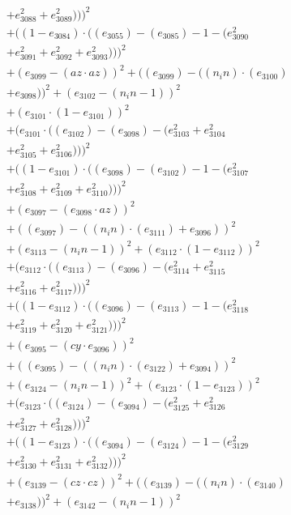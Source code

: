 \documentclass[10pt, a4paper]{article}
\begin{document}
\begin{small}
\begin{align*}
& + e_{3088}^{2} + e_{3089}^{2})))^{2} \\
& + ((1 - e_{3084})  \cdot  ((e_{3055}) - (e_{3085}) - 1 - (e_{3090}^{2} \\
& + e_{3091}^{2} + e_{3092}^{2} + e_{3093}^{2})))^{2} \\
& + (e_{3099} - (az  \cdot  az))^{2} + ((e_{3099}) - ((n_in)  \cdot  (e_{3100}) \\
& + e_{3098}))^{2} + (e_{3102} - (n_in - 1))^{2} \\
& + (e_{3101}  \cdot  (1 - e_{3101}))^{2} \\
& + (e_{3101}  \cdot  ((e_{3102}) - (e_{3098}) - (e_{3103}^{2} + e_{3104}^{2} \\
& + e_{3105}^{2} + e_{3106}^{2})))^{2} \\
& + ((1 - e_{3101})  \cdot  ((e_{3098}) - (e_{3102}) - 1 - (e_{3107}^{2} \\
& + e_{3108}^{2} + e_{3109}^{2} + e_{3110}^{2})))^{2} \\
& + (e_{3097} - (e_{3098}  \cdot  az))^{2} \\
& + ((e_{3097}) - ((n_in)  \cdot  (e_{3111}) + e_{3096}))^{2} \\
& + (e_{3113} - (n_in - 1))^{2} + (e_{3112}  \cdot  (1 - e_{3112}))^{2} \\
& + (e_{3112}  \cdot  ((e_{3113}) - (e_{3096}) - (e_{3114}^{2} + e_{3115}^{2} \\
& + e_{3116}^{2} + e_{3117}^{2})))^{2} \\
& + ((1 - e_{3112})  \cdot  ((e_{3096}) - (e_{3113}) - 1 - (e_{3118}^{2} \\
& + e_{3119}^{2} + e_{3120}^{2} + e_{3121}^{2})))^{2} \\
& + (e_{3095} - (cy  \cdot  e_{3096}))^{2} \\
& + ((e_{3095}) - ((n_in)  \cdot  (e_{3122}) + e_{3094}))^{2} \\
& + (e_{3124} - (n_in - 1))^{2} + (e_{3123}  \cdot  (1 - e_{3123}))^{2} \\
& + (e_{3123}  \cdot  ((e_{3124}) - (e_{3094}) - (e_{3125}^{2} + e_{3126}^{2} \\
& + e_{3127}^{2} + e_{3128}^{2})))^{2} \\
& + ((1 - e_{3123})  \cdot  ((e_{3094}) - (e_{3124}) - 1 - (e_{3129}^{2} \\
& + e_{3130}^{2} + e_{3131}^{2} + e_{3132}^{2})))^{2} \\
& + (e_{3139} - (cz  \cdot  cz))^{2} + ((e_{3139}) - ((n_in)  \cdot  (e_{3140}) \\
& + e_{3138}))^{2} + (e_{3142} - (n_in - 1))^{2} \\

\end{align*}
\end{small}
\end{document}
